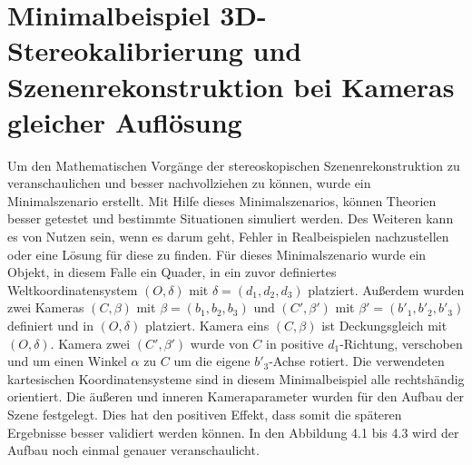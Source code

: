 \chapter{Minimalbeispiel 3D-Stereokalibrierung und Szenenrekonstruktion bei Kameras gleicher Auflösung}

Um den Mathematischen Vorgänge der stereoskopischen Szenenrekonstruktion zu veranschaulichen und besser nachvollziehen zu können, wurde ein Minimalszenario erstellt. Mit Hilfe dieses Minimalszenarios, können Theorien besser getestet und bestimmte Situationen simuliert werden. Des Weiteren kann es von Nutzen sein, wenn es darum geht, Fehler in Realbeispielen nachzustellen oder eine Lösung für diese zu finden. Für dieses Minimalszenario wurde ein Objekt, in diesem Falle ein Quader, in ein zuvor definiertes Weltkoordinatensystem $(O,\delta)$ mit $\delta = (d_1,d_2,d_3)$ platziert. Außerdem wurden zwei Kameras $(C,\beta)$ mit $\beta = (b_1,b_2,b_3)$ und $(C',\beta')$ mit $\beta' = (b'_1,b'_2,b'_3)$ definiert und in $(O,\delta)$ platziert. Kamera eins $(C,\beta)$ ist Deckungsgleich mit $(O,\delta)$. Kamera zwei $(C',\beta')$ wurde von $C$ in positive $d_1$-Richtung, verschoben und um einen Winkel $\alpha$ zu $C$ um die eigene $b'_3$-Achse rotiert. Die verwendeten kartesischen Koordinatensysteme sind in diesem Minimalbeispiel alle rechtshändig orientiert. Die äußeren und inneren Kameraparameter wurden für den Aufbau der Szene festgelegt. Dies hat den positiven Effekt, dass somit die späteren Ergebnisse besser validiert werden können. In den Abbildung 4.1 bis 4.3 wird der Aufbau noch einmal genauer veranschaulicht. \\

